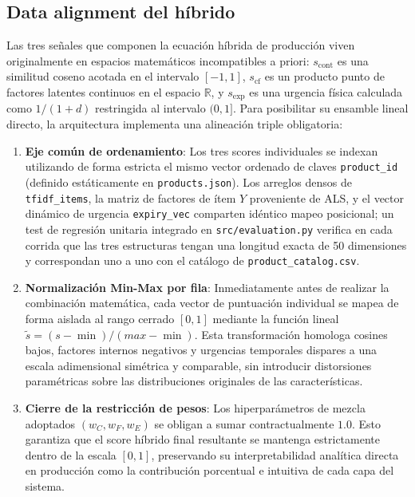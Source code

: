 \documentclass[12pt,a4paper]{article}
\newcommand{\code}[1]{\texttt{\small #1}}
\begin{document}
\subsection{Data alignment del híbrido}
\label{sec:alignment}

Las tres señales que componen la ecuación híbrida de producción viven originalmente en espacios matemáticos incompatibles a priori: $s_{\text{cont}}$ es una similitud coseno acotada en el intervalo $[-1, 1]$, $s_{\text{cf}}$ es un producto punto de factores latentes continuos en el espacio $\mathbb{R}$, y $s_{\text{exp}}$ es una urgencia física calculada como $1/(1+d)$ restringida al intervalo $(0, 1]$. Para posibilitar su ensamble lineal directo, la arquitectura implementa una alineación triple obligatoria:

\begin{enumerate}
    \item \textbf{Eje común de ordenamiento}: Los tres scores individuales se indexan utilizando de forma estricta el mismo vector ordenado de claves \code{product\_id} (definido estáticamente en \code{products.json}). Los arreglos densos de \code{tfidf\_items}, la matriz de factores de ítem $Y$ proveniente de ALS, y el vector dinámico de urgencia \code{expiry\_vec} comparten idéntico mapeo posicional; un test de regresión unitaria integrado en \code{src/evaluation.py} verifica en cada corrida que las tres estructuras tengan una longitud exacta de 50 dimensiones y correspondan uno a uno con el catálogo de \code{product\_catalog.csv}.
    \item \textbf{Normalización Min-Max por fila}: Inmediatamente antes de realizar la combinación matemática, cada vector de puntuación individual se mapea de forma aislada al rango cerrado $[0, 1]$ mediante la función lineal $\tilde s = (s - \min)/(max - \min)$. Esta transformación homologa cosines bajos, factores internos negativos y urgencias temporales dispares a una escala adimensional simétrica y comparable, sin introducir distorsiones paramétricas sobre las distribuciones originales de las características.
    \item \textbf{Cierre de la restricción de pesos}: Los hiperparámetros de mezcla adoptados $(w_C, w_F, w_E)$ se obligan a sumar contractualmente $1.0$. Esto garantiza que el score híbrido final resultante se mantenga estrictamente dentro de la escala $[0, 1]$, preservando su interpretabilidad analítica directa en producción como la contribución porcentual e intuitiva de cada capa del sistema.
\end{enumerate}
\end{document}
